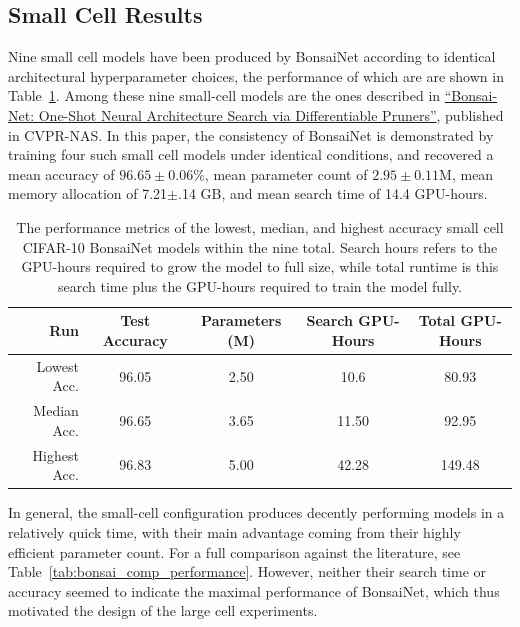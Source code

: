 \subsection{Small Cell Results}
Nine small cell models have been produced by BonsaiNet according to identical architectural hyperparameter choices, the
performance of which are are shown in Table~\ref{tab:small_cell_metrics}. Among these nine
small-cell models are the ones described in \hyperlink{cite.geada2020}{``Bonsai-Net: One-Shot Neural Architecture Search via
Differentiable Pruners''}\citep{geada2020}, published
in CVPR-NAS. In this paper, the consistency of BonsaiNet is demonstrated by training four such small cell
models under identical conditions, and recovered a mean accuracy of $96.65\pm0.06\%$, mean parameter count of
$2.95\pm0.11$M, mean memory allocation of 7.21$\pm$.14 GB, and mean search time of 14.4 GPU-hours.

\begin{table}[h]
\begin{center}
	\begin{tabular}{r|c|c|c|c}
	Run & Test Accuracy & Parameters (M) & Search GPU-Hours & Total GPU-Hours\\
	\hline
	Lowest Acc.    & 96.05 & 2.50 & 10.6  & 80.93\\
	Median Acc. & 96.65 & 3.65 & 11.50 & 92.95\\
	Highest Acc.   & 96.83 & 5.00 & 42.28 & 149.48\\
	\end{tabular}
\end{center}
\caption[Various performance metrics of the nine small cell CIFAR-10 BonsaiNet models]{The performance metrics of the lowest, median, and highest accuracy
small cell CIFAR-10 BonsaiNet models within the nine total. Search hours refers to the GPU-hours
required to grow the model to full size, while total runtime is this search time plus the GPU-hours required to train the model fully.}
\label{tab:small_cell_metrics}
\end{table}

In general, the small-cell configuration produces decently performing models in a relatively quick time, with their main
advantage coming from their highly efficient parameter count. For a full comparison against the literature, see
Table~\ref{tab:bonsai_comp_performance}. However, neither their
search time or accuracy seemed to indicate the maximal performance of BonsaiNet, which thus motivated
the design of the large cell experiments.

